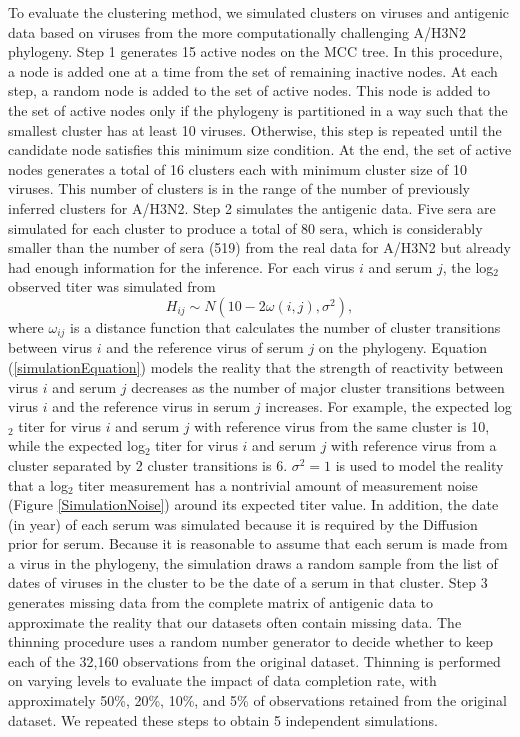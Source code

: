 \documentclass[11pt,oneside,letterpaper]{article}
\begin{document}

To evaluate the clustering method, we simulated clusters on viruses and antigenic data based on viruses from the more computationally challenging A/H3N2 phylogeny.
Step 1 generates 15 active nodes on the MCC tree. 
In this procedure, a node is added one at a time from the set of remaining inactive nodes.
At each step, a random node is added to the set of active nodes.
This node is added to the set of active nodes only if the phylogeny is partitioned in a way such that the smallest cluster has at least 10 viruses. Otherwise, this step is repeated until the candidate node satisfies this minimum size condition.
At the end, the set of active nodes generates a total of 16 clusters each with minimum cluster size of 10 viruses.
This number of clusters is in the range of the number of previously inferred clusters for A/H3N2\cite{smith_mapping_2004}. 
Step 2 simulates the antigenic data.
Five sera are simulated for each cluster to produce a total of 80 sera, which is considerably smaller than the number of sera (519) from the real data for A/H3N2 but already had enough information for the inference.
For each virus $i$ and serum $j$, the log$_2$ observed titer was simulated from 
\begin{equation}
 \label{simulationEquation}
H_{ij} \sim N(  10 -  2 \omega(i,j) ,  \sigma^2 )     ,
\end{equation}
where $\omega_{ij}$ is a distance function that calculates the number of cluster transitions  between virus $i$ and the reference virus of serum $j$ on the phylogeny.
Equation (\ref{simulationEquation}) models the reality that the strength of reactivity between virus $i$ and serum $j$ decreases as the number of major cluster transitions between virus $i$ and the reference virus in serum $j$ increases.
For example, the expected log$_2$ titer for virus $i$ and serum $j$ with reference virus from the same cluster is 10, while the expected log$_2$ titer for virus $i$ and serum $j$ with reference virus from a cluster separated by 2 cluster transitions is 6.
$\sigma^2 = 1$ is used to model the reality that a log$_2$ titer measurement has a nontrivial amount of measurement noise (Figure \ref{SimulationNoise}) around its expected titer value.
In addition, the date (in year) of each serum was simulated because it is required by the Diffusion prior for serum.
Because it is reasonable to assume that each serum is made from a virus in the phylogeny, the simulation draws a random sample from the list of dates of viruses in the cluster to be the date of a serum in that cluster.
Step 3 generates missing data from the complete matrix of antigenic data to approximate the reality that our datasets often contain missing data.
The thinning procedure uses a random number generator to decide whether to keep each of the 32,160 observations from the original dataset.
Thinning is performed on varying levels to evaluate the impact of data completion rate, with approximately 50\%, 20\%, 10\%, and 5\% of observations retained from the original dataset.
We repeated these steps to obtain 5 independent simulations.
\end{document}
